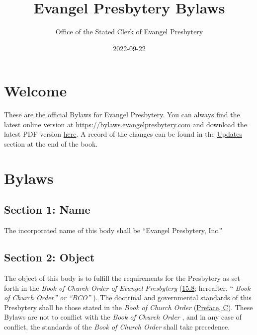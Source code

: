 \documentclass[
]{book}
\title{Evangel Presbytery Bylaws}
\author{Office of the Stated Clerk of Evangel Presbytery}
\date{2022-09-22}
\begin{document}
\maketitle

{
\hypersetup{linkcolor=}
\setcounter{tocdepth}{1}
\tableofcontents
}
\hypertarget{welcome}{%
\chapter*{Welcome}\label{welcome}}

These are the official Bylaws for Evangel Presbytery. You can always find the latest online version at \url{https://bylaws.evangelpresbytery.com} and download the latest PDF version \href{https://bylaws.evangelpresbytery.com/evangel-presbytery-bylaws.pdf}{here}. A record of the changes can be found in the \href{https://bylaws.evangelpresbytery.com/updates.html}{Updates} section at the end of the book.

\hypertarget{bylaws}{%
\chapter*{Bylaws}\label{bylaws}}

\hypertarget{section-1-name}{%
\section*{Section 1: Name}\label{section-1-name}}

The incorporated name of this body shall be ``Evangel Presbytery, Inc.''

\hypertarget{section-2-object}{%
\section*{Section 2: Object}\label{section-2-object}}

The object of this body is to fulfill the requirements for the Presbytery as set forth in the \emph{Book of Church Order of Evangel Presbytery} (\href{https://bco.evangelpresbytery.com/form-of-government.html\#the-presbytery}{15.8}; hereafter, `` \emph{Book of Church Order'' or ``BCO''} ). The doctrinal and governmental standards of this Presbytery shall be those stated in the \emph{Book of Church Order} (\href{https://bco.evangelpresbytery.com/preface.html}{Preface, C}). These Bylaws are not to conflict with the \emph{Book of Church Order} , and in any case of conflict, the standards of the \emph{Book of Church Order} shall take precedence.
\end{document}
